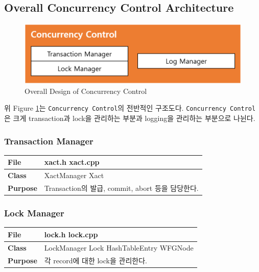 \documentclass[main.tex]{subfiles}
\begin{document}
\subsection{Overall Concurrency Control Architecture}

\begin{figure}[!hbt]
	\centering
	\includegraphics[width=.7\textwidth]{images/cc/overall_design.png}
	\caption{Overall Design of Concurrency Control}
	\label{cc:overall_design}
\end{figure}

위 Figure \ref{cc:overall_design}는 \texttt{Concurrency Control}의 전반적인 구조도다. \texttt{Concurrency Control}은 크게 transaction과 lock을 관리하는 부분과 logging을 관리하는 부분으로 나뉜다.

\subsubsection{Transaction Manager}
\begin{table}[!htb]
	\begin{tabularx}{\textwidth}{|l|X|}
		\hline
		\textbf{File} & xact.h xact.cpp \\
		\hline
		\textbf{Class} & XactManager Xact \\
		\hline
		\textbf{Purpose} & Transaction의 발급, commit, abort 등을 담당한다. \\
		\hline
	\end{tabularx}
\end{table}

\subsubsection{Lock Manager}
\begin{table}[!htb]
	\begin{tabularx}{\textwidth}{|l|X|}
		\hline
		\textbf{File} & lock.h lock.cpp \\
		\hline
		\textbf{Class} & LockManager Lock HashTableEntry WFGNode \\
		\hline
		\textbf{Purpose} & 각 record에 대한 lock을 관리한다. \\
		\hline
	\end{tabularx}
\end{table}
\end{document}
